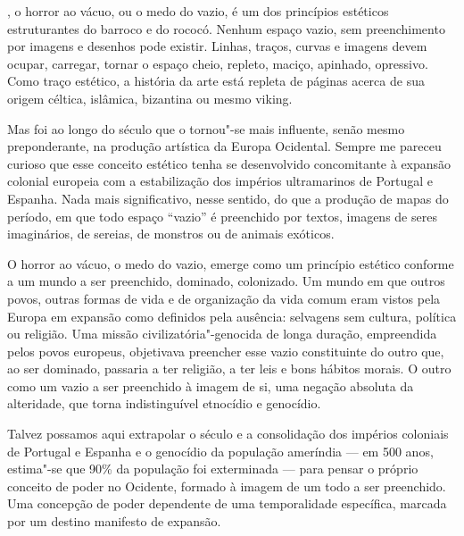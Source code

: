 \begin{multicols}{2}
, o horror ao vácuo, ou o medo do vazio, é um dos
princípios estéticos estruturantes do barroco e do rococó. Nenhum espaço
vazio, sem preenchimento por imagens e desenhos pode existir. Linhas,
traços, curvas e imagens devem ocupar, carregar, tornar o espaço cheio,
repleto, maciço, apinhado, opressivo. Como traço estético, a história da
arte está repleta de páginas acerca de sua origem céltica, islâmica,
bizantina ou mesmo viking.

\vspace{\baselineskip}

{\small{}}

\vspace{\baselineskip}

Mas foi ao longo do século  que o {} tornou"-se mais
influente, senão mesmo preponderante, na produção artística da Europa
Ocidental. Sempre me pareceu curioso que esse conceito estético tenha se
desenvolvido concomitante à expansão colonial europeia com a
estabilização dos impérios ultramarinos de Portugal e Espanha. Nada mais
significativo, nesse sentido, do que a produção de mapas do período, em
que todo espaço ``vazio'' é preenchido por textos, imagens de seres
imaginários, de sereias, de monstros ou de animais exóticos.

O horror ao vácuo, o medo do vazio, emerge como um princípio estético
conforme a um mundo a ser preenchido, dominado, colonizado. Um mundo em
que outros povos, outras formas de vida e de organização da vida comum
eram vistos pela Europa em expansão como definidos pela ausência:
selvagens sem cultura, política ou religião. Uma missão
civilizatória"-genocida de longa duração, empreendida pelos povos
europeus, objetivava preencher esse vazio constituinte do outro que, ao
ser dominado, passaria a ter religião, a ter leis e bons hábitos morais.
O outro como um vazio a ser preenchido à imagem de si, uma negação
absoluta da alteridade, que torna indistinguível etnocídio e genocídio.

Talvez possamos aqui extrapolar o século  e a consolidação dos
impérios coloniais de Portugal e Espanha e o genocídio da população
ameríndia --- em 500 anos, estima"-se que 90\% da população foi exterminada
--- para pensar o próprio conceito de poder no Ocidente, formado à imagem
de um todo a ser preenchido. Uma concepção de poder dependente de uma
temporalidade específica, marcada por um destino manifesto de expansão.


\end{multicols}
